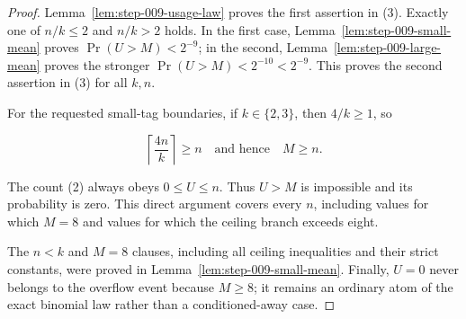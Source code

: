 \begin{proof}
Lemma~\ref{lem:step-009-usage-law} proves the first assertion in (3).
Exactly one of \(n/k\le2\) and \(n/k>2\) holds. In the first case,
Lemma~\ref{lem:step-009-small-mean} proves
\(\Pr(U>M)<2^{-9}\); in the second,
Lemma~\ref{lem:step-009-large-mean} proves the stronger
\(\Pr(U>M)<2^{-10}<2^{-9}\). This proves the second assertion in (3)
for all \(k,n\).

For the requested small-tag boundaries, if \(k\in\{2,3\}\), then
\(4/k\ge1\), so

\[
\left\lceil\frac{4n}{k}\right\rceil\ge n
\quad\text{and hence}\quad M\ge n.
\tag{26}
\]

The count (2) always obeys \(0\le U\le n\). Thus \(U>M\) is impossible
and its probability is zero. This direct argument covers every \(n\),
including values for which \(M=8\) and values for which the ceiling branch
exceeds eight.

The \(n<k\) and \(M=8\) clauses, including all ceiling inequalities and
their strict constants, were proved in
Lemma~\ref{lem:step-009-small-mean}. Finally, \(U=0\) never belongs to the
overflow event because \(M\ge8\); it remains an ordinary atom of the exact
binomial law rather than a conditioned-away case. \end{proof}

